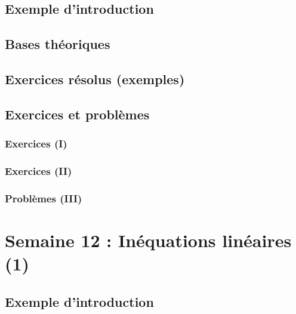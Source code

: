\documentclass[
  12pt,
]{book}
\begin{document}
\hypertarget{exemple-dintroduction-10}{%
\section{Exemple d'introduction}\label{exemple-dintroduction-10}}

\hypertarget{bases-thuxe9oriques-10}{%
\section{Bases théoriques}\label{bases-thuxe9oriques-10}}

\hypertarget{exercices-ruxe9solus-exemples-10}{%
\section{Exercices résolus (exemples)}\label{exercices-ruxe9solus-exemples-10}}

\hypertarget{exercices-et-probluxe8mes-10}{%
\section{Exercices et problèmes}\label{exercices-et-probluxe8mes-10}}

\hypertarget{exercices-i-10}{%
\subsection{Exercices (I)}\label{exercices-i-10}}

\hypertarget{exercices-ii-10}{%
\subsection{Exercices (II)}\label{exercices-ii-10}}

\hypertarget{probluxe8mes-iii-10}{%
\subsection{Problèmes (III)}\label{probluxe8mes-iii-10}}

\hypertarget{semaine-12-inuxe9quations-linuxe9aires-1}{%
\chapter{Semaine 12 : Inéquations linéaires (1)}\label{semaine-12-inuxe9quations-linuxe9aires-1}}

\hypertarget{exemple-dintroduction-11}{%
\section{Exemple d'introduction}\label{exemple-dintroduction-11}}
\end{document}
